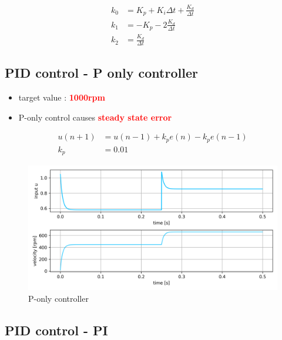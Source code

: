 \documentclass[12pt,twoside,onecolumn,openany,extrafontsizes,dvipsnames]{memoir}
\begin{document}
        
        \begin{align*}
            k_0 &= K_p + K_i\Delta t + \frac{K_d}{\Delta t} \\
            k_1 &= -K_p - 2\frac{K_d}{\Delta t} \\
            k_2 &= \frac{K_d}{\Delta t}
        \end{align*}

            \newpage
            \subsection{PID control - P only controller}

                \begin{itemize}
                    \item  target value : \textcolor{red}{\textbf { 1000rpm}}
                    \item  P-only control causes \textcolor{red}{\textbf {steady state error}}
                \end{itemize}
            
                \begin{align*}
                    u(n+1) &= u(n-1) + k_pe(n) - k_pe(n-1) \\
                    k_p    &= 0.01
                \end{align*}

                \begin{figure}[!htb]
                    \centering
                    \includegraphics[scale=0.8]{../images/motor_control/pid_p_control.png}
                    \caption{P-only controller}
                    \label{fig:p_controller}
                \end{figure}

            \newpage
            \subsection{PID control - PI}
                
\end{document}
